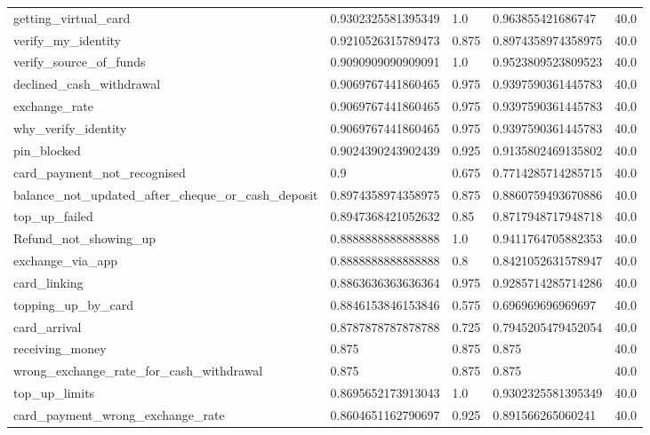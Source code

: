 \begin{table}[!ht]
\begin{tabularx}{\textwidth}{X l l l l}
getting\_virtual\_card & \num{0.9302325581395349} & \num{1.0} & \num{0.963855421686747} & \num{40.0} \\
verify\_my\_identity & \num{0.9210526315789473} & \num{0.875} & \num{0.8974358974358975} & \num{40.0} \\
verify\_source\_of\_funds & \num{0.9090909090909091} & \num{1.0} & \num{0.9523809523809523} & \num{40.0} \\
declined\_cash\_withdrawal & \num{0.9069767441860465} & \num{0.975} & \num{0.9397590361445783} & \num{40.0} \\
exchange\_rate & \num{0.9069767441860465} & \num{0.975} & \num{0.9397590361445783} & \num{40.0} \\
why\_verify\_identity & \num{0.9069767441860465} & \num{0.975} & \num{0.9397590361445783} & \num{40.0} \\
pin\_blocked & \num{0.9024390243902439} & \num{0.925} & \num{0.9135802469135802} & \num{40.0} \\
card\_payment\_not\_recognised & \num{0.9} & \num{0.675} & \num{0.7714285714285715} & \num{40.0} \\
balance\_not\_updated\_after\_cheque\_or\_cash\_deposit & \num{0.8974358974358975} & \num{0.875} & \num{0.8860759493670886} & \num{40.0} \\
top\_up\_failed & \num{0.8947368421052632} & \num{0.85} & \num{0.8717948717948718} & \num{40.0} \\
Refund\_not\_showing\_up & \num{0.8888888888888888} & \num{1.0} & \num{0.9411764705882353} & \num{40.0} \\
exchange\_via\_app & \num{0.8888888888888888} & \num{0.8} & \num{0.8421052631578947} & \num{40.0} \\
card\_linking & \num{0.8863636363636364} & \num{0.975} & \num{0.9285714285714286} & \num{40.0} \\
topping\_up\_by\_card & \num{0.8846153846153846} & \num{0.575} & \num{0.696969696969697} & \num{40.0} \\
card\_arrival & \num{0.8787878787878788} & \num{0.725} & \num{0.7945205479452054} & \num{40.0} \\
receiving\_money & \num{0.875} & \num{0.875} & \num{0.875} & \num{40.0} \\
wrong\_exchange\_rate\_for\_cash\_withdrawal & \num{0.875} & \num{0.875} & \num{0.875} & \num{40.0} \\
top\_up\_limits & \num{0.8695652173913043} & \num{1.0} & \num{0.9302325581395349} & \num{40.0} \\
card\_payment\_wrong\_exchange\_rate & \num{0.8604651162790697} & \num{0.925} & \num{0.891566265060241} & \num{40.0} \\

\end{tabularx}
\end{table}
